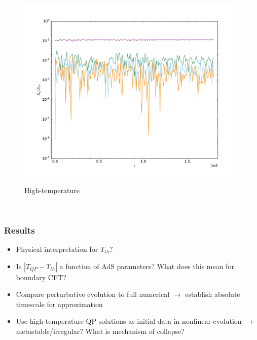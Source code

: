 \documentclass[mathserif,10pt]{beamer}
\newcommand{\bi}{\begin{itemize}}
\newcommand{\ei}{\end{itemize}}
\newcommand{\its}{\item}
\begin{document}
{{\begin{columns}
\begin{figure}
{      \includegraphics[width=\textwidth]{HighTa1_779e-01j100T2_0000e+01_lowjevo}
      }
       \begin{center} High-temperature \end{center}
      \end{figure}
  \end{columns}
  }
}

\subsection*{}
\frame
{
  \frametitle{Results}
    \bi
    \its Physical interpretation for $T_{th}$?
    \its Is $| T_{QP} - T_{th}|$ a function of AdS parameters? What does this mean for boundary CFT?
    \its Compare perturbative evolution to full numerical $\to$ establish absolute timescale for approximation
    \its Use high-temperature QP solutions as initial data in nonlinear evolution $\to$ metastable/irregular? What is mechanism of collapse?
    \ei
}
\end{document}
